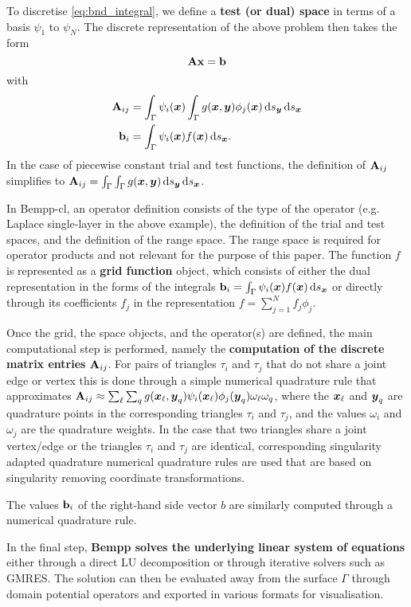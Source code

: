 To discretise \cref{eq:bnd_integral}, we define a \textbf{test (or dual) space} in terms of a basis \(\psi_1\) to \(\psi_N\). The discrete representation of the above problem then takes the form
$$
\mathbf{A}\mathbf{x} = \mathbf{b}
$$
with
\begin{align*}
\dmat{A}_{ij} &= \int_{\Gamma}\psi_i(\bx)\int_{\Gamma}g(\bx, \by)\phi_j(\bx)\ds[\by]\ds[\bx]\\
\dvec{b}_i &= \int_{\Gamma}\psi_i(\bx)f(\bx)\ds[\bx].
\end{align*}
In the case of piecewise constant trial and test functions, the definition of $\mathbf{A}_{ij}$ simplifies to $\dmat{A}_{ij} = \int_{\Gamma}\int_{\Gamma}g(\bx, \by)\ds[\by]\ds[\bx]$.

In Bempp-cl, an operator definition consists of the type of the operator (e.g. Laplace single-layer in the above example),
the definition of the trial and test spaces, and the definition of the range space. The range space is required for operator
products and not relevant for the purpose of this paper. The function $f$ is represented as a \textbf{grid function} object, which
consists of either the dual representation in the forms of the integrals $\dvec{b}_i = \int_{\Gamma}\psi_i(\bx)f(\bx)\ds[\bx]$ or directly through its coefficients $f_j$ in the representation $f=\sum_{j=1}^N f_j\phi_j$.

Once the grid, the space objects, and the operator(s) are defined, the main computational step is performed, namely the \textbf{computation of the discrete matrix entries} $\mathbf{A}_{ij}$. For pairs of triangles $\tau_i$ and $\tau_j$ that do not share a joint edge or vertex this is done through a simple numerical quadrature rule that approximates $\mathbf{A}_{ij}\approx \sum_{\ell}\sum_{q} g(\boldsymbol{x}_\ell, \boldsymbol{y}_q)\psi_i(\boldsymbol{x}_\ell)\phi_j(\boldsymbol{y}_q)\omega_\ell\omega_q$, where the $\boldsymbol{x}_\ell$ and $\boldsymbol{y}_q$ are quadrature points in the corresponding triangles $\tau_i$ and $\tau_j$, and the values $\omega_i$ and $\omega_j$ are the quadrature weights. In the case that two triangles share a joint vertex/edge or the triangles $\tau_i$ and $\tau_j$ are identical, corresponding singularity adapted quadrature numerical quadrature rules are used that are based on singularity removing coordinate transformations.

The values $\mathbf{b}_i$ of the right-hand side vector $b$ are similarly computed through a numerical quadrature rule.

In the final step, \textbf{Bempp solves the underlying linear system of equations} either through a direct LU decomposition or through iterative solvers such as GMRES. The solution can then be evaluated away from the surface $\Gamma$ through domain potential operators and exported in various formats for visualisation.


